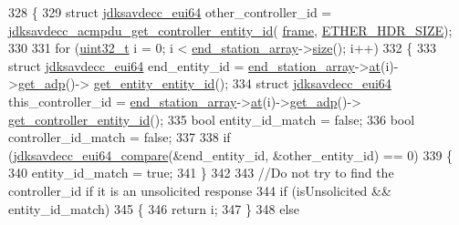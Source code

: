 \begin{DoxyCode}
328 \{
329     \textcolor{keyword}{struct }\hyperlink{structjdksavdecc__eui64}{jdksavdecc\_eui64} other\_controller\_id = 
      \hyperlink{group__acmpdu_ga4734ff28226ad92c7382a332e675d24e}{jdksavdecc\_acmpdu\_get\_controller\_entity\_id}(
      \hyperlink{gst__avb__playbin_8c_ac8e710e0b5e994c0545d75d69868c6f0}{frame}, \hyperlink{namespaceavdecc__lib_a6c827b1a0d973e18119c5e3da518e65ca9512ad9b34302ba7048d88197e0a2dc0}{ETHER\_HDR\_SIZE});
330 
331     \textcolor{keywordflow}{for} (\hyperlink{parse_8c_a6eb1e68cc391dd753bc8ce896dbb8315}{uint32\_t} i = 0; i < \hyperlink{classavdecc__lib_1_1controller__imp_a17c6518dbb728acdcd1c4e78d7bc1c5a}{end\_station\_array}->\hyperlink{classavdecc__lib_1_1end__stations_ad26f04adc7ec92298de9de96b7879779}{size}(); i++)
332     \{
333         \textcolor{keyword}{struct }\hyperlink{structjdksavdecc__eui64}{jdksavdecc\_eui64} end\_entity\_id = 
      \hyperlink{classavdecc__lib_1_1controller__imp_a17c6518dbb728acdcd1c4e78d7bc1c5a}{end\_station\_array}->\hyperlink{classavdecc__lib_1_1end__stations_a8b2053474417f106d063017c5b60bad2}{at}(i)->\hyperlink{classavdecc__lib_1_1end__station__imp_a471a74540ce6182fad0c17dfd010107e}{get\_adp}()->
      \hyperlink{classavdecc__lib_1_1adp_a7be0469ca6e8e700bde8d2c2b084fa49}{get\_entity\_entity\_id}();
334         \textcolor{keyword}{struct }\hyperlink{structjdksavdecc__eui64}{jdksavdecc\_eui64} this\_controller\_id = 
      \hyperlink{classavdecc__lib_1_1controller__imp_a17c6518dbb728acdcd1c4e78d7bc1c5a}{end\_station\_array}->\hyperlink{classavdecc__lib_1_1end__stations_a8b2053474417f106d063017c5b60bad2}{at}(i)->\hyperlink{classavdecc__lib_1_1end__station__imp_a471a74540ce6182fad0c17dfd010107e}{get\_adp}()->
      \hyperlink{classavdecc__lib_1_1adp_a0c0959a46658c0a22e9530334b2912da}{get\_controller\_entity\_id}();
335         \textcolor{keywordtype}{bool} entity\_id\_match = \textcolor{keyword}{false};
336         \textcolor{keywordtype}{bool} controller\_id\_match = \textcolor{keyword}{false};
337 
338         \textcolor{keywordflow}{if} (\hyperlink{group__eui64_ga1d7414dc665866d8ad0af100f8a52ef2}{jdksavdecc\_eui64\_compare}(&end\_entity\_id, &other\_entity\_id) == 0)
339         \{
340             entity\_id\_match = \textcolor{keyword}{true};
341         \}
342 
343         \textcolor{comment}{//Do not try to find the controller\_id if it is an unsolicited response}
344         \textcolor{keywordflow}{if} (isUnsolicited && entity\_id\_match)
345         \{
346             \textcolor{keywordflow}{return} i;
347         \}
348         \textcolor{keywordflow}{else}

\end{DoxyCode}
